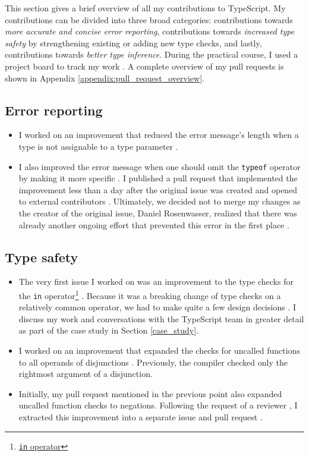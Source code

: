 \documentclass[12pt]{scrartcl}
\def\code#1{\texttt{\frenchspacing#1}}
\begin{document}
This section gives a brief overview of all my contributions to TypeScript. My contributions can be divided into three broad categories: contributions towards \textit{more accurate and concise error reporting}, contributions towards \textit{increased type safety} by strengthening existing or adding new type checks, and lastly, contributions towards \textit{better type inference}. During the practical course, I used a project board to track my work \cite{ProjectBoard}. A complete overview of my pull requests is shown in Appendix \ref{appendix:pull_request_overview}.

\subsection{Error reporting}

\begin{itemize}
    \item I worked on an improvement that reduced the error message's length when a type is not assignable to a type parameter \cite{42849,42952}.
    \item I also improved the error message when one should omit the \code{typeof} operator by making it more specific \cite{42523}. I published a pull request that implemented the improvement less than a day after the original issue was created and opened to external contributors \cite{42530}. Ultimately, we decided not to merge my changes as the creator of the original issue, Daniel Rosenwasser, realized that there was already another ongoing effort that prevented this error in the first place \cite{42530Comment}.
\end{itemize}

\subsection{Type safety}

\begin{itemize}
    \item The very first issue I worked on was an improvement to the type checks for the \code{in} operator\footnote{\href{https://developer.mozilla.org/en-US/docs/Web/JavaScript/Reference/Operators/in}{\code{in} operator}} \cite{41317}. Because it was a breaking change of type checks on a relatively common operator, we had to make quite a few design decisions \cite{41928}. I discuss my work and conversations with the TypeScript team in greater detail as part of the case study in Section \ref{case_study}.
    \item I worked on an improvement that expanded the checks for uncalled functions to all operands of disjunctions \cite{35584,42835}. Previously, the compiler checked only the rightmost argument of a disjunction.
    \item Initially, my pull request mentioned in the previous point also expanded uncalled function checks to negations. Following the request of a reviewer \cite{42835Comment}, I extracted this improvement into a separate issue \cite{43096} and pull request \cite{43097}.
\end{itemize}
\end{document}
